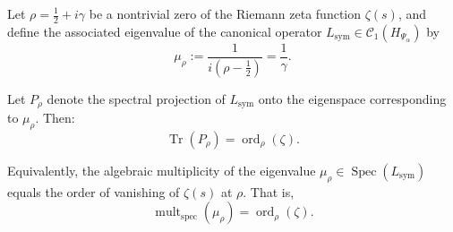 \begin{lemma}
\label{lem:spectral-multiplicity-matching}
Let \( \rho = \tfrac{1}{2} + i\gamma \) be a nontrivial zero of the Riemann zeta function \( \zeta(s) \), and define the associated eigenvalue of the canonical operator \( L_{\mathrm{sym}} \in \mathcal{C}_1(H_{\Psi_\alpha}) \) by
\[
\mu_\rho := \frac{1}{i(\rho - \tfrac{1}{2})} = \frac{1}{\gamma}.
\]

Let \( P_\rho \) denote the spectral projection of \( L_{\mathrm{sym}} \) onto the eigenspace corresponding to \( \mu_\rho \). Then:
\[
\operatorname{Tr}(P_\rho) = \operatorname{ord}_\rho(\zeta).
\]

Equivalently, the algebraic multiplicity of the eigenvalue \( \mu_\rho \in \operatorname{Spec}(L_{\mathrm{sym}}) \) equals the order of vanishing of \( \zeta(s) \) at \( \rho \). That is,
\[
\operatorname{mult}_{\mathrm{spec}}(\mu_\rho) = \operatorname{ord}_\rho(\zeta).
\]
\end{lemma}
% 